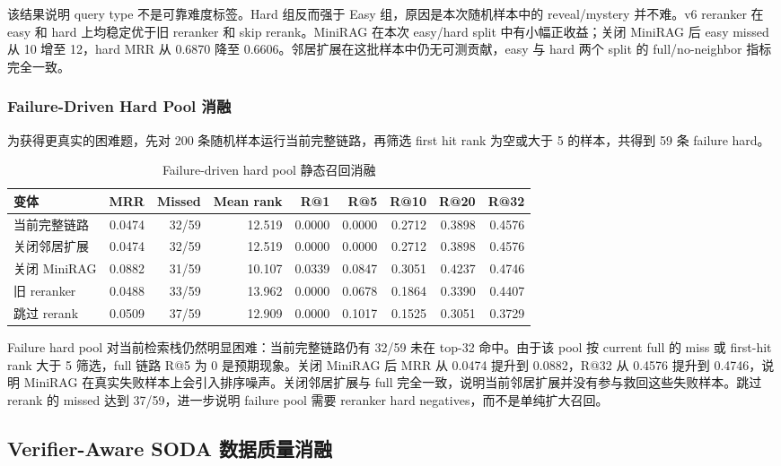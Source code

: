 \documentclass[UTF8,a4paper,12pt]{ctexart}
\begin{document}
该结果说明 query type 不是可靠难度标签。Hard 组反而强于 Easy 组，原因是本次随机样本中的 reveal/mystery 并不难。v6 reranker 在 easy 和 hard 上均稳定优于旧 reranker 和 skip rerank。MiniRAG 在本次 easy/hard split 中有小幅正收益；关闭 MiniRAG 后 easy missed 从 10 增至 12，hard MRR 从 0.6870 降至 0.6606。邻居扩展在这批样本中仍无可测贡献，easy 与 hard 两个 split 的 full/no-neighbor 指标完全一致。

\subsubsection{Failure-Driven Hard Pool 消融}

为获得更真实的困难题，先对 200 条随机样本运行当前完整链路，再筛选 first hit rank 为空或大于 5 的样本，共得到 59 条 failure hard。

\begin{table}[htbp]
\centering
\small
\begin{tabular}{lrrrrrrrr}
\toprule
变体 & MRR & Missed & Mean rank & R@1 & R@5 & R@10 & R@20 & R@32 \\
\midrule
当前完整链路 & 0.0474 & 32/59 & 12.519 & 0.0000 & 0.0000 & 0.2712 & 0.3898 & 0.4576 \\
关闭邻居扩展 & 0.0474 & 32/59 & 12.519 & 0.0000 & 0.0000 & 0.2712 & 0.3898 & 0.4576 \\
关闭 MiniRAG & 0.0882 & 31/59 & 10.107 & 0.0339 & 0.0847 & 0.3051 & 0.4237 & 0.4746 \\
旧 reranker & 0.0488 & 33/59 & 13.962 & 0.0000 & 0.0678 & 0.1864 & 0.3390 & 0.4407 \\
跳过 rerank & 0.0509 & 37/59 & 12.909 & 0.0000 & 0.1017 & 0.1525 & 0.3051 & 0.3729 \\
\bottomrule
\end{tabular}
\caption{Failure-driven hard pool 静态召回消融}
\end{table}

Failure hard pool 对当前检索栈仍然明显困难：当前完整链路仍有 32/59 未在 top-32 命中。由于该 pool 按 current full 的 miss 或 first-hit rank 大于 5 筛选，full 链路 R@5 为 0 是预期现象。关闭 MiniRAG 后 MRR 从 0.0474 提升到 0.0882，R@32 从 0.4576 提升到 0.4746，说明 MiniRAG 在真实失败样本上会引入排序噪声。关闭邻居扩展与 full 完全一致，说明当前邻居扩展并没有参与救回这些失败样本。跳过 rerank 的 missed 达到 37/59，进一步说明 failure pool 需要 reranker hard negatives，而不是单纯扩大召回。

\subsection{Verifier-Aware SODA 数据质量消融}
\end{document}
